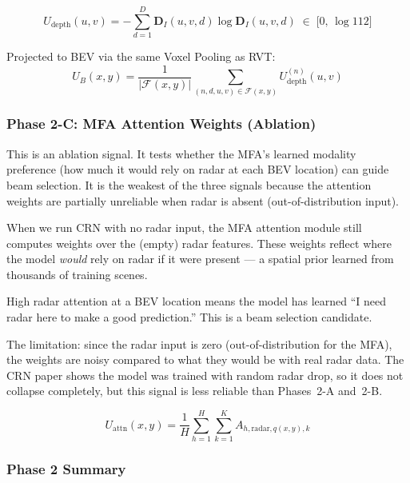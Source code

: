 \documentclass[12pt, a4paper]{article}
\newcommand{\DI}{\mathbf{D}_{I}}
\newcommand{\Udep}{U_{\mathrm{depth}}}
\newcommand{\Uatt}{U_{\mathrm{attn}}}
\theoremstyle{definition}
\begin{document}
\begin{equation}
  \Udep(u,v)
  = -\sum_{d=1}^{D}\DI(u,v,d)\log\DI(u,v,d)
  \;\in\;\bigl[0,\,\log 112\bigr]
  \label{eq:depth_entropy}
\end{equation}

Projected to BEV via the same Voxel Pooling as RVT:
\begin{equation}
  U_B(x,y) = \frac{1}{|\mathcal{F}(x,y)|}
  \sum_{(n,d,u,v)\in\mathcal{F}(x,y)}\Udep^{(n)}(u,v)
  \label{eq:depth_entropy_bev}
\end{equation}

\subsubsection{Phase 2-C: MFA Attention Weights (Ablation)}

\begin{ablationbox}
This is an ablation signal. It tests whether the MFA's learned modality
preference (how much it would rely on radar at each BEV location) can guide
beam selection. It is the weakest of the three signals because the attention
weights are partially unreliable when radar is absent (out-of-distribution input).
\end{ablationbox}

\begin{plainbox}
When we run CRN with no radar input, the MFA attention module still computes
weights over the (empty) radar features. These weights reflect where the model
\emph{would} rely on radar if it were present --- a spatial prior learned
from thousands of training scenes.

High radar attention at a BEV location means the model has learned
``I need radar here to make a good prediction.''
This is a beam selection candidate.

The limitation: since the radar input is zero (out-of-distribution for the MFA),
the weights are noisy compared to what they would be with real radar data.
The CRN paper shows the model was trained with random radar drop, so it
does not collapse completely, but this signal is less reliable than Phases~2-A and~2-B.
\end{plainbox}

\begin{equation}
  \Uatt(x,y)
  = \frac{1}{H}\sum_{h=1}^{H}\sum_{k=1}^{K} A_{h,\mathrm{radar},q(x,y),k}
  \label{eq:attention_uncertainty}
\end{equation}

\subsubsection{Phase 2 Summary}
\end{document}
